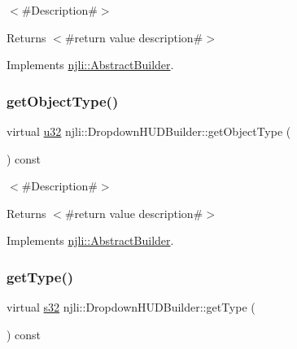$<$\#\+Description\#$>$

\begin{DoxyReturn}{Returns}
$<$\#return value description\#$>$ 
\end{DoxyReturn}


Implements \mbox{\hyperlink{classnjli_1_1_abstract_builder_a902f73ea78031b06aca183a417f3413b}{njli\+::\+Abstract\+Builder}}.

\mbox{\label{classnjli_1_1_dropdown_h_u_d_builder_ad16e640fcd624dc05489ceb19153bc94}} 
\subsubsection{\texorpdfstring{get\+Object\+Type()}{getObjectType()}}
{\footnotesize\ttfamily virtual \mbox{\hyperlink{_util_8h_a10e94b422ef0c20dcdec20d31a1f5049}{u32}} njli\+::\+Dropdown\+H\+U\+D\+Builder\+::get\+Object\+Type (\begin{DoxyParamCaption}{ }\end{DoxyParamCaption}) const\hspace{0.3cm}{\ttfamily [virtual]}}

$<$\#\+Description\#$>$

\begin{DoxyReturn}{Returns}
$<$\#return value description\#$>$ 
\end{DoxyReturn}


Implements \mbox{\hyperlink{classnjli_1_1_abstract_builder_a0f2d344fcf697b167f4f2b1122b5fb33}{njli\+::\+Abstract\+Builder}}.

\mbox{\label{classnjli_1_1_dropdown_h_u_d_builder_a43865f1a44b5139f73eb6cb24263a6c1}} 
\subsubsection{\texorpdfstring{get\+Type()}{getType()}}
{\footnotesize\ttfamily virtual \mbox{\hyperlink{_util_8h_aa62c75d314a0d1f37f79c4b73b2292e2}{s32}} njli\+::\+Dropdown\+H\+U\+D\+Builder\+::get\+Type (\begin{DoxyParamCaption}{ }\end{DoxyParamCaption}) const\hspace{0.3cm}{\ttfamily [virtual]}}

